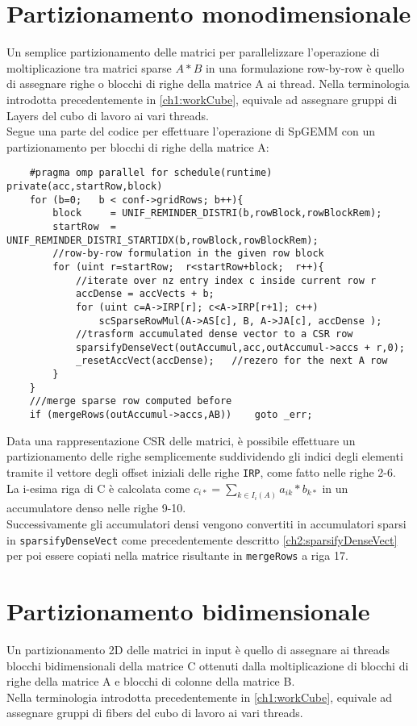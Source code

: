 \section{Partizionamento monodimensionale}
Un semplice partizionamento delle matrici per parallelizzare l'operazione di
moltiplicazione tra matrici sparse $A * B$ in una formulazione row-by-row è quello di 
assegnare righe o blocchi di righe della matrice A ai thread.
Nella terminologia introdotta precedentemente in \ref{ch1:workCube}, equivale ad
assegnare gruppi di Layers del cubo di lavoro ai vari threads.\\
Segue una parte del codice per effettuare l'operazione di SpGEMM con 
un partizionamento per blocchi di righe della matrice A:    \label{ch2:part1DGroup}
\begin{lstlisting}
    #pragma omp parallel for schedule(runtime) private(acc,startRow,block)
    for (b=0;   b < conf->gridRows; b++){
        block     = UNIF_REMINDER_DISTRI(b,rowBlock,rowBlockRem);
        startRow  = UNIF_REMINDER_DISTRI_STARTIDX(b,rowBlock,rowBlockRem);
        //row-by-row formulation in the given row block
        for (uint r=startRow;  r<startRow+block;  r++){
            //iterate over nz entry index c inside current row r
            accDense = accVects + b;
            for (uint c=A->IRP[r]; c<A->IRP[r+1]; c++) 
                scSparseRowMul(A->AS[c], B, A->JA[c], accDense );
            //trasform accumulated dense vector to a CSR row
            sparsifyDenseVect(outAccumul,acc,outAccumul->accs + r,0);
            _resetAccVect(accDense);   //rezero for the next A row
        }
    }
    ///merge sparse row computed before
    if (mergeRows(outAccumul->accs,AB))    goto _err;
\end{lstlisting}
Data una rappresentazione CSR delle matrici, è possibile effettuare un 
partizionamento delle righe semplicemente suddividendo gli indici degli elementi
\nnz tramite il vettore degli offset iniziali delle righe \verb|IRP|,
come fatto nelle righe 2-6.\\
La i-esima riga di C è calcolata come 
$c_{i*} = \sum\limits_{k \in I_i(A)}  a_{ik} \ast  b_{k*}$  in un accumulatore denso
nelle righe 9-10.\\
Successivamente gli accumulatori densi vengono convertiti in accumulatori sparsi
in \verb|sparsifyDenseVect| come precedentemente descritto \ref{ch2:sparsifyDenseVect}
per poi essere copiati nella matrice risultante in \verb|mergeRows| a riga 17.

\section{Partizionamento bidimensionale}
Un partizionamento 2D delle matrici in input è quello di assegnare ai threads 
blocchi bidimensionali della matrice C ottenuti dalla moltiplicazione di
blocchi di righe della matrice A e blocchi di colonne della matrice B.\\
Nella terminologia introdotta precedentemente in \ref{ch1:workCube}, equivale ad
assegnare gruppi di fibers del cubo di lavoro ai vari threads.\\

